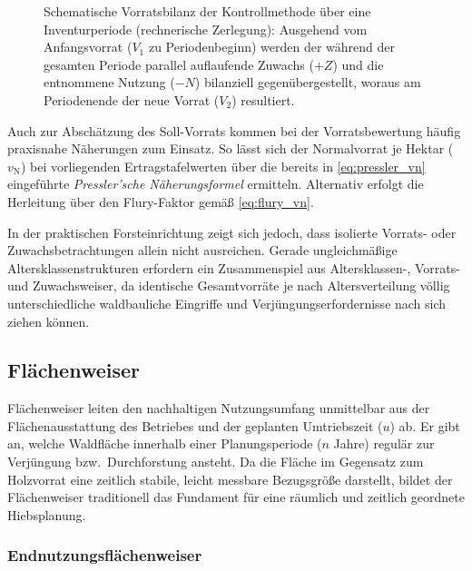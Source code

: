 \documentclass[twocolumn, paper=a4, fontsize=10pt]{scrartcl}
\begin{document}
\begin{figure}[!htbp]
  \caption{Schematische Vorratsbilanz der Kontrollmethode über eine Inventurperiode (rechnerische Zerlegung): Ausgehend vom Anfangsvorrat ($V_1$ zu Periodenbeginn) werden der während der gesamten Periode parallel auflaufende Zuwachs ($+Z$) und die entnommene Nutzung ($-N$) bilanziell gegenübergestellt, woraus am Periodenende der neue Vorrat ($V_2$) resultiert.}
  \label{fig:kontrollmethode}
\end{figure}

Auch zur Abschätzung des Soll-Vorrats kommen bei der Vorratsbewertung häufig praxisnahe Näherungen zum Einsatz. So lässt sich der Normalvorrat je Hektar ($v_{\text{N}}$) bei vorliegenden Ertragstafelwerten über die bereits in \cref{eq:pressler_vn} eingeführte \emph{Pressler'sche Näherungsformel} ermitteln. Alternativ erfolgt die Herleitung über den Flury-Faktor gemäß \cref{eq:flury_vn}.

In der praktischen Forsteinrichtung zeigt sich jedoch, dass isolierte Vorrats- oder Zuwachsbetrachtungen allein nicht ausreichen. Gerade ungleichmäßige Altersklassenstrukturen erfordern ein Zusammenspiel aus Altersklassen-, Vorrats- und Zuwachsweiser, da identische Gesamtvorräte je nach Altersverteilung völlig unterschiedliche waldbauliche Eingriffe und Verjüngungserfordernisse nach sich ziehen können.

\subsection{Flächenweiser}

Flächenweiser leiten den nachhaltigen Nutzungsumfang unmittelbar aus der Flächenausstattung des Betriebes und der geplanten Umtriebszeit ($u$) ab. Er gibt an, welche Waldfläche innerhalb einer Planungsperiode ($n$ Jahre) regulär zur Verjüngung bzw.\ Durchforstung ansteht. Da die Fläche im Gegensatz zum Holzvorrat eine zeitlich stabile, leicht messbare Bezugsgröße darstellt, bildet der Flächenweiser traditionell das Fundament für eine räumlich und zeitlich geordnete Hiebsplanung.

\subsubsection{Endnutzungsflächenweiser}
\end{document}
